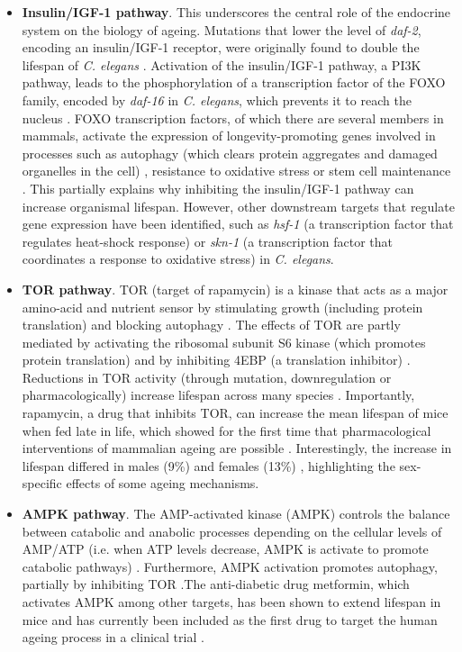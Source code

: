 \begin{itemize} 

	\item \textbf{Insulin/\acrshort{IGF-1} pathway}. This underscores the central role of the endocrine system on the biology of ageing. Mutations that lower the level of \textit{daf-2}, encoding an insulin/IGF-1 receptor, were originally found to double the lifespan of \textit{C. elegans} \cite{Kenyon1993,Guarente2000}. Activation of the insulin/IGF-1 pathway, a PI3K pathway, leads to the phosphorylation of a transcription factor of the FOXO family, encoded by \textit{daf-16} in \textit{C. elegans}, which prevents it to reach the nucleus \cite{Lin2001}. FOXO transcription factors, of which there are several members in mammals, activate the expression of longevity-promoting genes involved in processes such as autophagy (which clears protein aggregates and damaged organelles in the cell) \cite{Singh2019}, resistance to oxidative stress or stem cell maintenance \cite{Martins2016}. This partially explains why inhibiting the insulin/IGF-1 pathway can increase organismal lifespan. However, other downstream targets that regulate gene expression have been identified, such as \textit{hsf-1} (a transcription factor that regulates heat-shock response) \cite{Hsu2003} or \textit{skn-1} (a transcription factor that coordinates a response to oxidative stress) \cite{Tullet2008} in \textit{C. elegans}.
	
	\item \textbf{\acrshort{TOR} pathway}. \acrshort{TOR} (target of rapamycin) is a kinase that acts as a major amino-acid and nutrient sensor by stimulating growth (including protein translation) and blocking autophagy \cite{Kenyon2010}. The effects of TOR are partly mediated by activating the ribosomal subunit S6 kinase (which promotes protein translation) and by inhibiting 4EBP (a translation inhibitor)  \cite{Kenyon2010,Um2006}. Reductions in TOR activity (through mutation, downregulation or pharmacologically) increase lifespan across many species \cite{Kenyon2010}. Importantly, rapamycin, a drug that inhibits TOR, can increase the mean lifespan of mice when fed late in life, which showed for the first time that pharmacological interventions of mammalian ageing are possible \cite{Harrison2009}. Interestingly, the increase in lifespan differed in males (9\%) and females (13\%) \cite{Harrison2009}, highlighting the sex-specific effects of some ageing mechanisms. 
	
	\item \textbf{AMPK pathway}. The AMP-activated kinase (\acrshort{AMPK}) controls the balance between catabolic and anabolic processes depending on the cellular levels of \acrshort{AMP}/\acrshort{ATP} (i.e. when ATP levels decrease, AMPK is activate to promote catabolic pathways) \cite{Kenyon2010,Mihaylova2011}. Furthermore, AMPK activation promotes autophagy, partially by inhibiting TOR \cite{Mihaylova2011}.The anti-diabetic drug metformin, which activates AMPK among other targets, has been shown to extend lifespan in mice \cite{Anisimov2008,Martin-Montalvo2013} and has currently been included as the first drug to target the human ageing process in a clinical trial \cite{Barzilai2016}.
		

\end{itemize}
